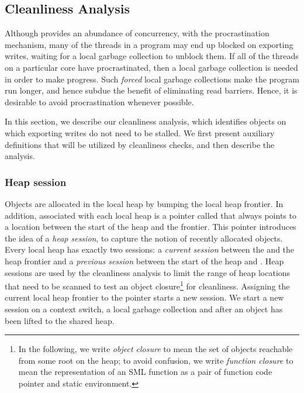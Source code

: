 \subsection{Cleanliness Analysis}
\label{sec:clean}

Although \acml provides an abundance of concurrency, with the procrastination
mechanism, many of the threads in a program may end up blocked on exporting
writes, waiting for a local garbage collection to unblock them. If all of the
threads on a particular core have procrastinated, then a local garbage
collection is needed in order to make progress. Such \emph{forced} local
garbage collections make the program run longer, and hence subdue the benefit
of eliminating read barriers. Hence, it is desirable to avoid procrastination
whenever possible.

In this section, we describe our cleanliness analysis, which identifies objects
on which exporting writes do not need to be stalled. We first present auxiliary
definitions that will be utilized by cleanliness checks, and then describe the
analysis.

\subsubsection{Heap session}

Objects are allocated in the local heap by bumping the local heap frontier. In
addition, associated with each local heap is a pointer called 
that always points to a location between the start of the heap and the
frontier. This pointer introduces the idea of a \emph{heap session}, to capture
the notion of recently allocated objects. Every local heap has exactly two
sessions: a \emph{current session} between the  and the heap
frontier and a \emph{previous session} between the start of the heap and
. Heap sessions are used by the cleanliness analysis to limit
the range of heap locations that need to be scanned to test an object
closure\footnote{In the following, we write \emph{object closure} to mean the
set of objects reachable from some root on the heap; to avoid confusion, we
write \emph{function closure} to mean the representation of an SML function as
a pair of function code pointer and static environment.} for cleanliness.
Assigning the current local heap frontier to the  pointer
starts a new session. We start a new session on a context switch, a local
garbage collection and after an object has been lifted to the shared heap.

